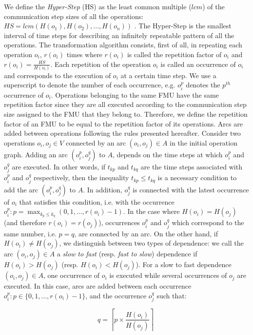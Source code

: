 We define the \textit{Hyper-Step} (HS) as the least common multiple ($lcm$) of the communication step sizes of all the operations: $HS=lcm(H(o_1),H(o_2), \dots ,H(o_n))$%
. The Hyper-Step is the smallest interval of time steps for describing an infinitely repeatable pattern of all the operations. The transformation algorithm consists, first of all, in repeating each operation $o_i$, $r(o_i)$ times where $r(o_i)$ is called the repetition factor of $o_i$ and $r(o_i) = \frac{HS}{H(o_i)}$. Each repetition of the operation $o_i$ is called an occurrence of $o_i$ and corresponds to the execution of $o_i$ at a certain time step. We use a superscript to denote the number of each occurrence, e.g. $o_i^p$ denotes the $p^{th}$ occurrence of $o_i$. Operations belonging to the same FMU have the same repetition factor since they are all executed according to the communication step size assigned to the FMU that they belong to. Therefore, we define the repetition factor of an FMU to be equal to the repetition factor of its operations. Arcs are added between operations following the rules presented hereafter. Consider two operations $o_i, o_j \in V$ connected by an arc $(o_i,o_j) \in A$ in the initial operation graph. Adding an arc $(o_i^p,o_j^q)$ to $A$, depends on the time steps at which $o_i^p$ and $o_j^q$ are executed. In other words, if $t_{kp}$ and $t_{kq}$ are the time steps associated with $o_i^p$ and $o_j^q$ respectively, then the inequality $t_{kp} \leq t_{kq}$ is a necessary condition to add the arc $(o_i^p,o_j^q)$ to $A$. In addition, $o_j^q$ is connected with the latest occurrence of $o_i$ that satisfies this condition, i.e. with the occurrence $o_i^p: p=\max_{k_{p} \leq k_{q}}(0,1, \dots ,r(o_i)-1)$. In the case where $H(o_i) = H(o_j)$ (and therefore $r(o_i) = r(o_j)$), occurrences $o_i^p$ and $o_j^q$ which correspond to the same number, i.e. $p = q$, are connected by an arc. On the other hand, if $H(o_i) \neq H(o_j)$, we distinguish between two types of dependence: we call the arc $(o_i,o_j) \in A$ a \textit{slow to fast} (resp. \textit{fast to slow}) dependence if $H(o_i) > H(o_j)$ (resp. $H(o_i) < H(o_j)$). For a slow to fast dependence $(o_i,o_j) \in A$, one occurrence of $o_i$ is executed while several occurrences of $o_j$ are executed. In this case, arcs are added between each occurrence $o_i^p: p \in \{0,1, \dots ,r(o_i)-1\}$, and the occurrence $o_j^q$ such that:

\begin{equation}
q = \left \lceil{p \times \frac{H(o_i)}{H(o_j)}}\right \rceil\;
\end{equation}

